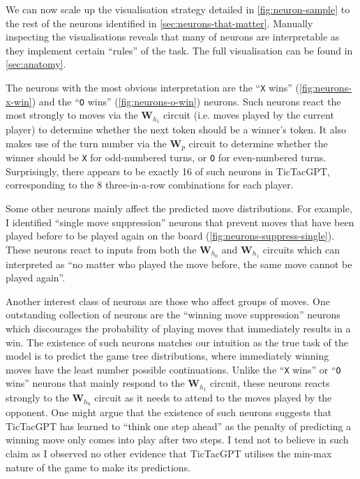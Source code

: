 \documentclass{article}
\newcommand{\ttgpt}{TicTacGPT\xspace}
\newcommand{\m}[1]{\mathbf{\bm{#1}}}
\newcounter{num}
\begin{document}
We can now scale up the visualisation strategy detailed in \cref{fig:neuron-sample} to the rest of the neurons identified in \cref{sec:neurons-that-matter}. Manually inspecting the visualisations reveals that many of neurons are interpretable as they implement certain ``rules'' of the task. The full visualisation can be found in \cref{sec:anatomy}.

The neurons with the most obvious interpretation are the ``\texttt{X} wins'' (\cref{fig:neurons-x-win}) and the ``\texttt{O} wins'' (\cref{fig:neurons-o-win}) neurons. Such neurons react the most strongly to moves via the $\m{W}_{h_1}$ circuit (i.e. moves played by the current player) to determine whether the next token should be a winner's token. It also makes use of the turn number via the $\m{W}_p$ circuit to determine whether the winner should be \texttt{X} for odd-numbered turns, or \texttt{O} for even-numbered turns. Surprisingly, there appears to be exactly 16 of such neurons in \ttgpt, corresponding to the 8 three-in-a-row combinations for each player.

Some other neurons mainly affect the predicted move distributions. For example, I identified ``single move suppression'' neurons that prevent moves that have been played before to be played again on the board (\cref{fig:neurons-suppress-single}). These neurons react to inputs from both the $\m{W}_{h_0}$ and $\m{W}_{h_1}$ circuits which can interpreted as ``no matter who played the move before, the same move cannot be played again''.

Another interest class of neurons are those who affect groups of moves. One outstanding collection of neurons are the ``winning move suppression'' neurons which discourages the probability of playing moves that immediately results in a win. The existence of such neurons matches our intuition as the true task of the model is to predict the game tree distributions, where immediately winning moves have the least number possible continuations. Unlike the ``\texttt{X} wins'' or ``\texttt{O} wins'' neurons that mainly respond to the $\m{W}_{h_1}$ circuit, these neurons reacts strongly to the $\m{W}_{h_0}$ circuit as it needs to attend to the moves played by the opponent. One might argue that the existence of such neurons suggests that \ttgpt has learned to ``think one step ahead'' as the penalty of predicting a winning move only comes into play after two steps. I tend not to believe in such claim as I observed no other evidence that \ttgpt utilises the min-max nature of the game to make its predictions.
\end{document}

